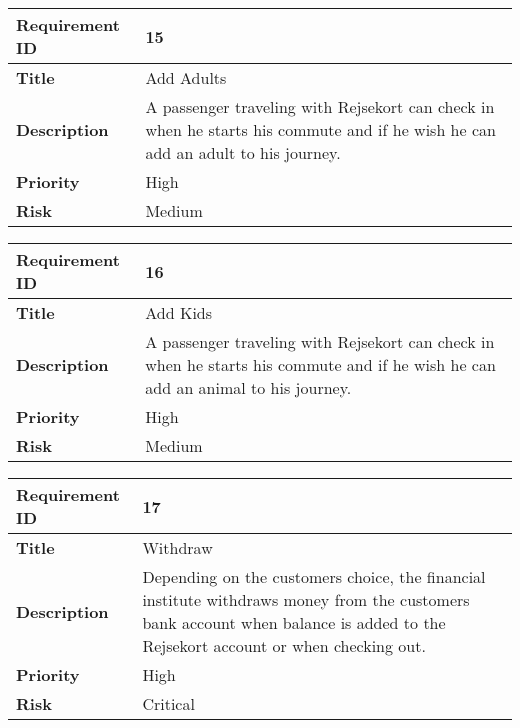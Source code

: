 \begin{center}
	\def\arraystretch{1.5}%
    \begin{tabular}{ | p{5cm} | p{5cm} |}
    \hline
    	\textbf{Requirement ID} & 15 \\ \hline
		\textbf{Title} & Add Adults\\ \hline
		\textbf{Description} & A passenger traveling with Rejsekort can check in when he starts his commute and if he wish he can add an adult to his journey.\\ \hline
		\textbf{Priority} & High\\ \hline
		\textbf{Risk} & Medium\\
      \hline
    \end{tabular}
\end{center}

\begin{center}
	\def\arraystretch{1.5}%
    \begin{tabular}{ | p{5cm} | p{5cm} |}
    \hline
    	\textbf{Requirement ID} & 16 \\ \hline
		\textbf{Title} & Add Kids\\ \hline
		\textbf{Description} & A passenger traveling with Rejsekort can check in when he starts his commute and if he wish he can add an animal to his journey.\\ \hline
		\textbf{Priority} & High\\ \hline
		\textbf{Risk} & Medium\\
      \hline
    \end{tabular}
\end{center}

\begin{center}
	\def\arraystretch{1.5}%
    \begin{tabular}{ | p{5cm} | p{5cm} |}
    \hline
    	\textbf{Requirement ID} & 17 \\ \hline
		\textbf{Title} & Withdraw\\ \hline
		\textbf{Description} & Depending on the customers choice, the financial institute withdraws money from the customers bank account when balance is added to the Rejsekort account or when checking out.\\ \hline
		\textbf{Priority} & High\\ \hline
		\textbf{Risk} & Critical\\
      \hline
    \end{tabular}
\end{center}


